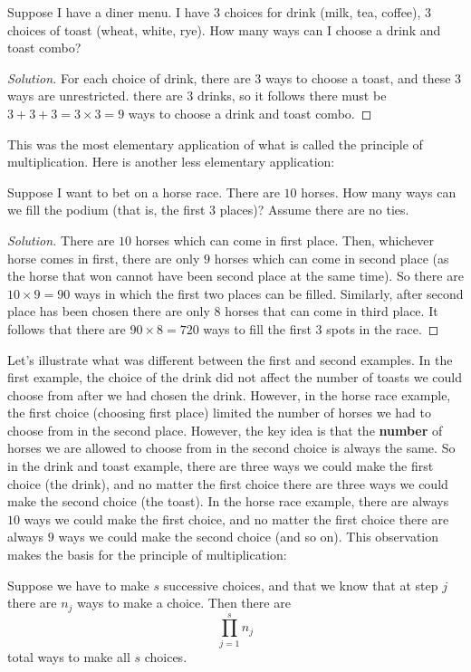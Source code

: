 \begin{example}
 Suppose I have a diner menu. I have 3 choices for drink (milk, tea, coffee), 3 choices of toast (wheat, white, rye). How many ways can I choose a drink and toast combo?
\end{example}
\begin{proof}[Solution]
 For each choice of drink, there are $3$ ways to choose a toast, and these $3$ ways are unrestricted. there are $3$ drinks, so it follows there must be $3 + 3 + 3 = 3 \times 3 = 9$ ways to choose a drink and toast combo.
\end{proof}

This was the most elementary application of what is called the principle of multiplication. Here is another less elementary application:
\begin{example}
 Suppose I want to bet on a horse race. There are $10$ horses. How many ways can we fill the podium (that is, the first 3 places)? Assume there are no ties.
\end{example}
\begin{proof}[Solution]
 There are $10$ horses which can come in first place. Then, whichever horse comes in first, there are only $9$ horses which can come in second place (as the horse that won cannot have been second place at the same time). So there are $10 \times 9 = 90$ ways in which the first two places can be filled. Similarly, after second place has been chosen there are only $8$ horses that can come in third place. It follows that there are $90 \times 8 = 720$ ways to fill the first $3$ spots in the race.
\end{proof}

Let's illustrate what was different between the first and second examples. In the first example, the choice of the drink did not affect the number of toasts we could choose from after we had chosen the drink. However, in the horse race example, the first choice (choosing first place) limited the number of horses we had to choose from in the second place. However, the key idea is that the \textbf{number} of horses we are allowed to choose from in the second choice is always the same. So in the drink and toast example, there are three ways we could make the first choice (the drink), and no matter the first choice there are three ways we could make the second choice (the toast). In the horse race example, there are always $10$ ways we could make the first choice, and no matter the first choice there are always $9$ ways we could make the second choice (and so on). This observation makes the basis for the principle of multiplication:

\begin{tcolorbox}
 Suppose we have to make $s$ successive choices, and that we know that at step $j$ there are $n_j$ ways to make a choice. Then there are
 \[\prod_{j = 1}^sn_j\] total ways to make all $s$ choices. 
\end{tcolorbox}